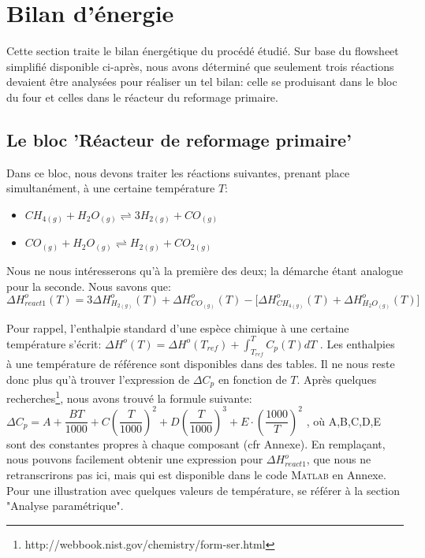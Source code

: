 \documentclass[11pt,a4paper]{report}
\author{Groupe 1246}
\begin{document}
\section*{Bilan d'énergie}

Cette section traite le bilan énergétique du procédé étudié.
Sur base du flowsheet simplifié disponible ci-après, nous avons déterminé que seulement trois réactions
devaient être analysées pour réaliser un tel bilan: celle se produisant dans le bloc du four et celles dans 
le réacteur du reformage primaire.

\subsection*{Le bloc 'Réacteur de reformage primaire'}

Dans ce bloc, nous devons traiter les réactions suivantes, prenant place simultanément, à une certaine température $T$:

\begin{itemize}
\item{$CH_{4(g)} + H_{2}O_{(g)} \rightleftharpoons  3H_{2(g)} + CO_{(g)}$}
\item{$CO_{(g)} + H_{2}O_{(g)} \rightleftharpoons  H_{2(g)} + CO_{2(g)}$}
\end{itemize}

\bigbreak
Nous ne nous intéresserons qu'à la première des deux; la démarche étant analogue pour la seconde. Nous savons que:
$$\Delta H^o_{react1}(T)=3\Delta H^o_{H_{2(g)}}(T) + \Delta H^o_{CO_{(g)}}(T) - \lbrack\Delta H^o_{CH_{4(g)}}(T) + 
\Delta H^o_{H_{2}O_{(g)}}(T)\rbrack$$

Pour rappel, l'enthalpie standard d'une espèce chimique à une certaine température s'écrit: 
$\Delta H^o(T)=\Delta H^o(T_{ref})  +\int_{T_{ref}}^{T} C_{p}(T)dT$ . Les enthalpies à une température de référence 
sont disponibles dans des tables. Il ne nous reste donc plus qu'à trouver l'expression de $\Delta C_p$ en fonction de $T$.
Après quelques recherches\footnote{http://webbook.nist.gov/chemistry/form-ser.html}, nous avons trouvé la formule 
suivante: $\Delta C_p=A+\dfrac{BT}{1000}+C(\dfrac{T}{1000})^2+D(\dfrac{T}{1000})^3+E\cdot(\dfrac{1000}{T})^2$ , 
où A,B,C,D,E sont des constantes propres à chaque composant (cfr Annexe).
En remplaçant, nous pouvons facilement obtenir une expression pour $\Delta H^o_{react1}$, que nous ne retranscrirons pas
ici, mais qui est disponible dans le code \textsc{Matlab} en Annexe. Pour une illustration avec quelques valeurs de 
température, se référer à la section "Analyse paramétrique".
\end{document}
